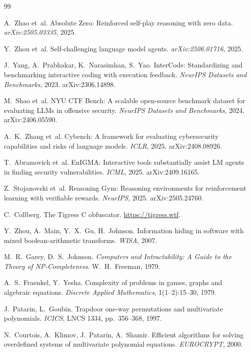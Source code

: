 \documentclass[10pt]{article}
\begin{document}
\begin{thebibliography}{99}
\small

 A.~Zhao et~al. Absolute Zero: Reinforced self-play reasoning with zero data.
\emph{arXiv:2505.03335}, 2025.

 Y.~Zhou et~al. Self-challenging language model agents.
\emph{arXiv:2506.01716}, 2025.

 J.~Yang, A.~Prabhakar, K.~Narasimhan, S.~Yao. InterCode: Standardizing and
benchmarking interactive coding with execution feedback. \emph{NeurIPS Datasets and Benchmarks},
2023. arXiv:2306.14898.

 M.~Shao et~al. NYU CTF Bench: A scalable open-source benchmark dataset for
evaluating LLMs in offensive security. \emph{NeurIPS Datasets and Benchmarks}, 2024.
arXiv:2406.05590.

 A.~K.~Zhang et~al. Cybench: A framework for evaluating cybersecurity capabilities
and risks of language models. \emph{ICLR}, 2025. arXiv:2408.08926.

 T.~Abramovich et~al. EnIGMA: Interactive tools substantially assist LM agents in
finding security vulnerabilities. \emph{ICML}, 2025. arXiv:2409.16165.

 Z.~Stojanovski et~al. Reasoning Gym: Reasoning environments for
reinforcement learning with verifiable rewards. \emph{NeurIPS}, 2025. arXiv:2505.24760.

 C.~Collberg. The Tigress C obfuscator. \url{https://tigress.wtf}.

 Y.~Zhou, A.~Main, Y.~X.~Gu, H.~Johnson. Information hiding in software with mixed
boolean-arithmetic transforms. \emph{WISA}, 2007.

 M.~R.~Garey, D.~S.~Johnson. \emph{Computers and Intractability: A Guide to
the Theory of NP-Completeness}. W.~H.~Freeman, 1979.

 A.~S.~Fraenkel, Y.~Yesha. Complexity of problems in games, graphs and
algebraic equations. \emph{Discrete Applied Mathematics}, 1(1--2):15--30, 1979.

 J.~Patarin, L.~Goubin. Trapdoor one-way permutations and multivariate
polynomials. \emph{ICICS}, LNCS 1334, pp.~356--368, 1997.

 N.~Courtois, A.~Klimov, J.~Patarin, A.~Shamir. Efficient algorithms for solving
overdefined systems of multivariate polynomial equations. \emph{EUROCRYPT}, 2000.


\end{thebibliography}
\end{document}
